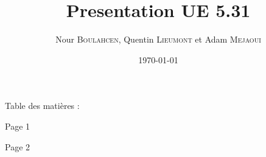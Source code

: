 \documentclass{beamer}
\title{Presentation UE 5.31}
\author{
    Nour \textsc{Boulahcen},
    Quentin \textsc{Lieumont} et
    Adam \textsc{Mejaoui}
}
\institute{Institut Villebon Georges \textsc{Charpak}}
\date{\today}
\begin{document}
\begin{frame}
    \titlepage
\end{frame}

\begin{frame}{Table des matières :}
    \tableofcontents
\end{frame}

\begin{frame}{Page 1}
    \tableofcontents
\end{frame}

\begin{frame}{Page 2}
\end{frame}
\end{document}
